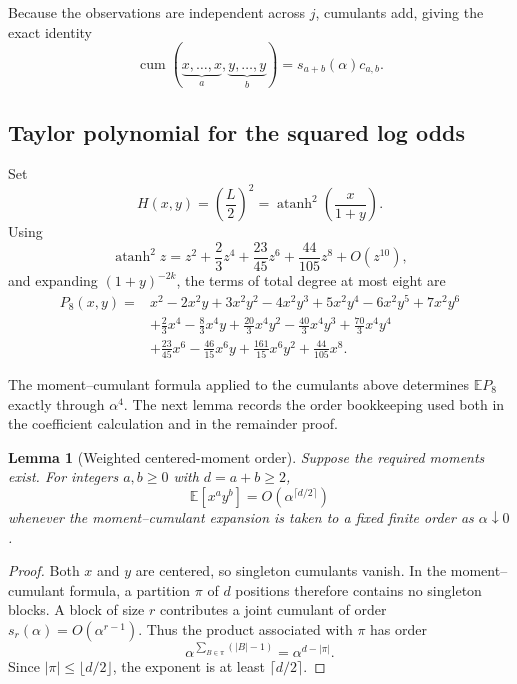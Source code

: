 \documentclass[11pt]{article}
\newtheorem{lemma}{Lemma}
\newcommand{\E}{\mathbb E}
\newcommand{\atanh}{\operatorname{atanh}}
\newcommand{\cum}{\operatorname{cum}}
\begin{document}
Because the observations are independent across $j$, cumulants add, giving the exact identity
\begin{equation}
\boxed{
\cum(\underbrace{x,\ldots,x}_{a},\underbrace{y,\ldots,y}_{b})
=s_{a+b}(\alpha)c_{a,b}.}
\end{equation}

\subsection{Taylor polynomial for the squared log odds}
Set
\begin{equation}
H(x,y)=\left(\frac L2\right)^2
=\atanh^2\!\left(\frac{x}{1+y}\right).
\end{equation}
Using
\begin{equation}
\atanh^2 z=z^2+\frac23z^4+\frac{23}{45}z^6+\frac{44}{105}z^8+O(z^{10}),
\end{equation}
and expanding $(1+y)^{-2k}$, the terms of total degree at most eight are
\begin{align}
P_8(x,y)={}&x^2-2x^2y+3x^2y^2-4x^2y^3+5x^2y^4-6x^2y^5+7x^2y^6\\
&+\frac23x^4-\frac83x^4y+\frac{20}{3}x^4y^2-\frac{40}{3}x^4y^3+\frac{70}{3}x^4y^4\\
&+\frac{23}{45}x^6-\frac{46}{15}x^6y+\frac{161}{15}x^6y^2
+\frac{44}{105}x^8.
\end{align}

The moment--cumulant formula applied to the cumulants above determines $\E P_8$ exactly through $\alpha^4$. The next lemma records the order bookkeeping used both in the coefficient calculation and in the remainder proof.

\begin{lemma}[Weighted centered-moment order]
Suppose the required moments exist. For integers $a,b\ge0$ with $d=a+b\ge2$,
\begin{equation}
\E[x^ay^b]=O\!\left(\alpha^{\lceil d/2\rceil}\right)
\end{equation}
whenever the moment--cumulant expansion is taken to a fixed finite order as $\alpha\downarrow0$.
\end{lemma}

\begin{proof}
Both $x$ and $y$ are centered, so singleton cumulants vanish. In the moment--cumulant formula, a partition $\pi$ of $d$ positions therefore contains no singleton blocks. A block of size $r$ contributes a joint cumulant of order $s_r(\alpha)=O(\alpha^{r-1})$. Thus the product associated with $\pi$ has order
\begin{equation}
\alpha^{\sum_{B\in\pi}(|B|-1)}=\alpha^{d-|\pi|}.
\end{equation}
Since $|\pi|\le\lfloor d/2\rfloor$, the exponent is at least $\lceil d/2\rceil$.
\end{proof}
\end{document}
